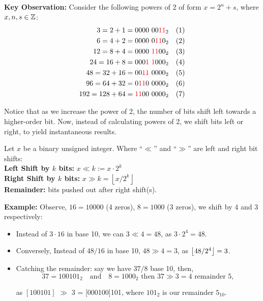 \noindent
\textbf{Key Observation:} Consider the following powers of 2 of form $x=2^n+s$, where $x,n,s\in\Z$:
\begin{align*}
    3 = 2 + 1 &= 0000 \ 00\textcolor{red}{11}_2 \quad (1) \\
    6 = 4 + 2 &= 0000 \ 0\textcolor{red}{11}0_2 \quad (2) \\
    12 = 8 + 4 &= 0000 \ \textcolor{red}{11}00_2 \quad (3) \\
    24 = 16 + 8 &= 000\textcolor{red}{1} \ \textcolor{red}{1}000_2 \quad (4) \\
    48 = 32 + 16 &= 00\textcolor{red}{11} \ 0000_2 \quad (5) \\
    96 = 64 + 32 &= 0\textcolor{red}{11}0 \ 0000_2 \quad (6) \\
    192 = 128 + 64 &= \textcolor{red}{11}00 \ 0000_2 \quad (7)
\end{align*}

\noindent
Notice that as we increase the power of 2, the number of bits shift left towards a higher-order bit. Now, instead of calculating powers of 
2, we shift bits left or right, to yield instantaneous results.

\begin{theo}

    \label{theo:bit_shift}

    Let $x$ be a binary unsigned integer. Where ``$\ll$'' and ``$\gg$'' are left and right bit shifts:\\
    \noindent
    \textbf{Left Shift by $k$ bits:} $x \ll k:= x \cdot 2^k$\\
    \noindent
    \textbf{Right Shift by $k$ bits:} $x \gg k = \left\lfloor x/2^k \right\rfloor$\\
    \textbf{Remainder:} bits pushed out after right shift(s).
\end{theo}

\newpage
\noindent
\textbf{Example:} Observe, $16=10000$ (4 zeros), $8=1000$ (3 zeros), we shift by 4 and 3 respectively:
\begin{itemize}
    \item Instead of $3 \cdot 16$ in base 10, we can $3 \ll 4=48$, as $3 \cdot 2^4 = 48$.
    \item Conversely, Instead of $48/16$ in base 10, $48 \gg 4 = 3$, as $\floor*{48/2^4} = 3$.
    \item Catching the remainder: say we have $37/8$ base 10, then,
        \[ 37 = 100101_2 \quad \text{and} \quad 8 = 1000_2 \text{ then } 37 \gg 3 = 4 \text{ remainder } 5,\]

    \noindent    
    as  $[100101]$ $\gg$ 3 = [000100]101, where $101_2$ is our remainder $5_{10}$.
\end{itemize}

